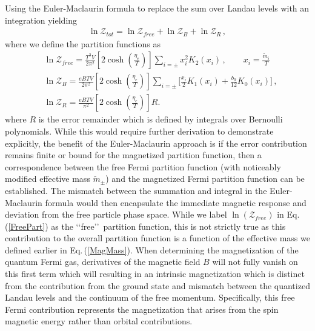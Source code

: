 \documentclass[twocolumn,preprintnumbers,amsmath,amssymb]{revtex4-2}
\newcommand{\req}[1]{Eq.\,({\ref{#1}})}
\begin{document}
Using the Euler-Maclaurin formula to replace the sum over Landau levels with an integration yielding
\begin{align}
\ln\mathcal{Z}_{tot}=\ln\mathcal{Z}_{free}+\ln\mathcal{Z}_B+\ln\mathcal{Z}_R\,,
\end{align}
where we define the partition functions as  
\begin{align}
 \label{FreePart}&\ln\mathcal{Z}_{free}=\frac{T^3V}{2\pi^2}\left[2\cosh{\left(\frac{\eta_{e}}{T}\right)}\right]\sum_{i=\pm}x_i^2K_2\left(x_i\right)\,,\qquad x_i=\frac{\tilde{m}_i}{T}\\
 \label{MagPart}&\ln\mathcal{Z}_B=\frac{eBTV}{2\pi^2}\left[2\cosh{\left(\frac{\eta_{e}}{T}\right)}\right]\sum_{i=\pm}\bigg[\frac{x_i}{2}K_1\left(x_i\right)+\frac{b_0}{12}K_0\left(x_i\right)\bigg]\,,\\
 \label{ErrorPart}&\ln\mathcal{Z}_R=\frac{eBTV}{\pi^2}\left[2\cosh{\left(\frac{\eta_{e}}{T}\right)}\right]R.
\end{align}
where $R$ is the error remainder which is defined by integrals over Bernoulli polynomials.
While this would require further derivation to demonstrate explicitly, the benefit of the Euler-Maclaurin approach is if the error contribution remains finite or bound for the magnetized partition function, then a correspondence between the free Fermi partition function (with noticeably modified effective mass $\tilde{m}_{\pm}$) and the magnetized Fermi partition function can be established. The mismatch between the summation and integral in the Euler-Maclaurin formula would then encapsulate the immediate magnetic response and deviation from the free particle phase space. While we label $\ln(\mathcal{Z}_{free})$ in \req{FreePart} as the \lq\lq free\rq\rq\ partition function, this is not strictly true as this contribution to the overall partition function is a function of the effective mass we defined earlier in \req{MagMass}. When determining the magnetization of the quantum Fermi gas, derivatives of the magnetic field $B$ will not fully vanish on this first term which will resulting in an intrinsic magnetization which is distinct from the contribution from the ground state and mismatch between the quantized Landau levels and the continuum of the free momentum. Specifically, this free Fermi contribution represents the magnetization that arises from the spin magnetic energy rather than orbital contributions.
\end{document}
